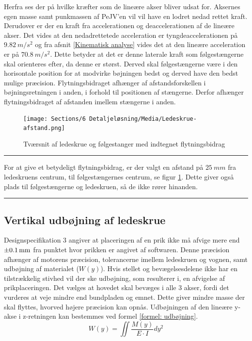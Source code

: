 Herfra ses der på hvilke kræfter som de lineære akser bliver udsat for. Aksernes egen masse samt punkmassen af PeJV'en vil vil have en lodret nedad rettet kraft. Derudover er der en kraft fra accelerationen og deaccelerationen af de lineære akser. Det vides at den nedadrettetede acceleration er tyngdeaccelerationen på $\SI{9,82}{m/s^2}$ og fra afsnit \ref{Kinematisk analyse} vides det at den lineære acceleration er på $\SI{70,8}{m/s^2}$. Dette betyder at det er denne laterale kraft som følgestængerne skal orienteres efter, da denne er størst. Derved skal følgestængerne være i den horisontale position for at modvirke bøjningen bedst og derved have den bedst mulige præcision. Flytningsbidraget afhænger af afstandsforskellen i bøjningsretningen i anden, i forhold til positionen af stængerne. Derfor afhænger flytningsbidraget af afstanden imellem stængerne i anden. 
\begin{figure} [H]
    \centering
\texttt{[image: Sections/6 Detaljeløsning/Media/Ledeskrue-afstand.png]}
    \caption{Tværsnit af ledeskrue og følgestanger med indtegnet flytningsbidrag}
    \label{fig:flytningsbidrag}
\end{figure} \plainbreak{-.5}
For at give et betydeligt flytningsbidrag, er der valgt en afstand på $\SI{25}{mm}$ fra ledeskruens centrum, til følgestængernes centrum, se figur \ref{fig:flytningsbidrag}. Dette giver også plads til følgestængerne og ledeskruen, så de ikke rører hinanden.



\plainbreak{2}
\subsection{Vertikal udbøjning af ledeskrue} \label{Præcisions beregninger}
Designspecifikation 3 angiver at placeringen af en prik ikke må afvige mere end \(\SI{\pm0,1}{mm}\) fra punktet hvor prikken er angivet af softwaren. Denne præcision afhænger af motorens præcision, tolerancerne imellem ledeskruen og vognen, samt udbøjning af materialet ($W(y)$). Hvis stellet og bevægelsesdelene ikke har en tilstrækkelig stivhed vil der ske udbøjning, som resulterer i, en afvigelse af prikplaceringen. Det vælges at hovedet skal bevæges i alle 3 akser, fordi det vurderes at veje mindre end bundpladen og emnet. Dette giver mindre masse der skal flyttes, hvorved højere præcision kan opnås. Udbøjningen af den lineære y-akse i z-retningen kan bestemmes ved formel \ref{formel: udbøjning}.
\begin{equation} \label{formel: udbøjning}
    W(y)=\iint \frac{M(y)}{E \cdot I} dy^2
\end{equation}



